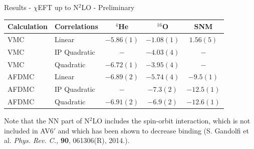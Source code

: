\documentclass{beamer}
\begin{document}
\begin{frame}{Results - $\chi$EFT up to N$^2$LO - Preliminary}
\begin{table}[htb]
   \centering
   \begin{tabular}{llccc}
      \hline
      Calculation & Correlations & $^4$He & $^{16}$O & SNM \\
      \hline
      VMC   & Linear       & $-5.86(1)$ & $-1.08(1)$ & $1.56(5)$ \\
      VMC   & IP Quadratic & $-$        & $-4.03(4)$ & $-$ \\
      VMC   & Quadratic    & $-6.72(1)$ & $-3.95(4)$ & $-$ \\
      \hline
      AFDMC & Linear       & $-6.89(2)$ & $-5.74(4)$ & $-9.5(1)$ \\
      AFDMC & IP Quadratic & $-$        & $-7.3(2)$  & $-12.5(1)$ \\
      AFDMC & Quadratic    & $-6.91(2)$ & $-6.9(2)$  & $-12.6(1)$ \\
      \hline
   \end{tabular}
   \label{tab:chiquad}
\end{table}
\small Note that the NN part of N$^2$LO includes the spin-orbit interaction, which is not included in AV6$'$ and which has been shown to decrease binding (S. Gandolfi et al. \textit{Phys. Rev. C.,} \textbf{90}, 061306(R), 2014.).
\end{frame}
\end{document}
